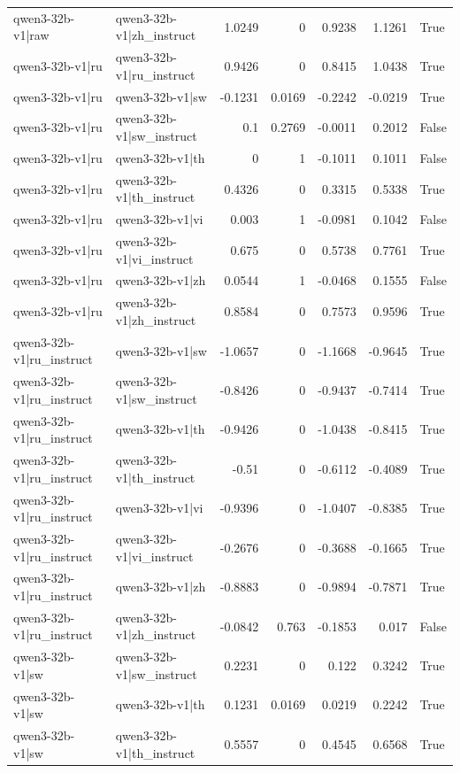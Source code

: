 \begin{table}
\begin{tabular}{l l r r r r l}
qwen3-32b-v1|raw & qwen3-32b-v1|zh_instruct & 1.0249 & 0 & 0.9238 & 1.1261 & True \\
qwen3-32b-v1|ru & qwen3-32b-v1|ru_instruct & 0.9426 & 0 & 0.8415 & 1.0438 & True \\
qwen3-32b-v1|ru & qwen3-32b-v1|sw & -0.1231 & 0.0169 & -0.2242 & -0.0219 & True \\
qwen3-32b-v1|ru & qwen3-32b-v1|sw_instruct & 0.1 & 0.2769 & -0.0011 & 0.2012 & False \\
qwen3-32b-v1|ru & qwen3-32b-v1|th & 0 & 1 & -0.1011 & 0.1011 & False \\
qwen3-32b-v1|ru & qwen3-32b-v1|th_instruct & 0.4326 & 0 & 0.3315 & 0.5338 & True \\
qwen3-32b-v1|ru & qwen3-32b-v1|vi & 0.003 & 1 & -0.0981 & 0.1042 & False \\
qwen3-32b-v1|ru & qwen3-32b-v1|vi_instruct & 0.675 & 0 & 0.5738 & 0.7761 & True \\
qwen3-32b-v1|ru & qwen3-32b-v1|zh & 0.0544 & 1 & -0.0468 & 0.1555 & False \\
qwen3-32b-v1|ru & qwen3-32b-v1|zh_instruct & 0.8584 & 0 & 0.7573 & 0.9596 & True \\
qwen3-32b-v1|ru_instruct & qwen3-32b-v1|sw & -1.0657 & 0 & -1.1668 & -0.9645 & True \\
qwen3-32b-v1|ru_instruct & qwen3-32b-v1|sw_instruct & -0.8426 & 0 & -0.9437 & -0.7414 & True \\
qwen3-32b-v1|ru_instruct & qwen3-32b-v1|th & -0.9426 & 0 & -1.0438 & -0.8415 & True \\
qwen3-32b-v1|ru_instruct & qwen3-32b-v1|th_instruct & -0.51 & 0 & -0.6112 & -0.4089 & True \\
qwen3-32b-v1|ru_instruct & qwen3-32b-v1|vi & -0.9396 & 0 & -1.0407 & -0.8385 & True \\
qwen3-32b-v1|ru_instruct & qwen3-32b-v1|vi_instruct & -0.2676 & 0 & -0.3688 & -0.1665 & True \\
qwen3-32b-v1|ru_instruct & qwen3-32b-v1|zh & -0.8883 & 0 & -0.9894 & -0.7871 & True \\
qwen3-32b-v1|ru_instruct & qwen3-32b-v1|zh_instruct & -0.0842 & 0.763 & -0.1853 & 0.017 & False \\
qwen3-32b-v1|sw & qwen3-32b-v1|sw_instruct & 0.2231 & 0 & 0.122 & 0.3242 & True \\
qwen3-32b-v1|sw & qwen3-32b-v1|th & 0.1231 & 0.0169 & 0.0219 & 0.2242 & True \\
qwen3-32b-v1|sw & qwen3-32b-v1|th_instruct & 0.5557 & 0 & 0.4545 & 0.6568 & True \\

\end{tabular}
\end{table}
